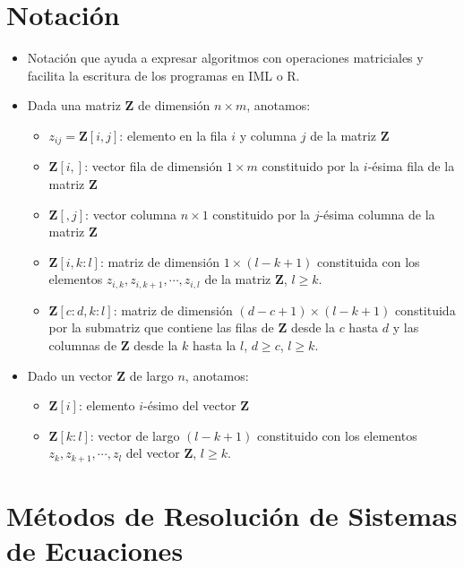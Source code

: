 \documentclass[]{book}
\providecommand{\tightlist}{%
  \setlength{\itemsep}{0pt}\setlength{\parskip}{0pt}}
\begin{document}
\hypertarget{notaciuxf3n}{%
\section{Notación}\label{notaciuxf3n}}

\begin{itemize}
\item
  Notación que ayuda a expresar algoritmos con operaciones matriciales y facilita la escritura de los programas en IML o R.
\item
  Dada una matriz \(\mathbf{Z}\) de dimensión \(n \times m\), anotamos:

  \begin{itemize}
  \tightlist
  \item
    \(z_{ij} = \mathbf{Z}[i, j]\): elemento en la fila \(i\) y columna \(j\) de la matriz \(\mathbf{Z}\)
  \item
    \(\mathbf{Z}[i,]\): vector fila de dimensión \(1\times m\) constituido por la \(i\)-ésima fila de la matriz \(\mathbf{Z}\)
  \item
    \(\mathbf{Z}[,j]\): vector columna \(n\times 1\) constituido por la \(j\)-ésima columna de la matriz \(\mathbf{Z}\)
  \item
    \(\mathbf{Z}[i,k:l]\): matriz de dimensión \(1\times (l-k+1)\) constituida con los elementos \(z_{i,k}, z_{i,k+1}, \cdots, z_{i,l}\) de la matriz \(\mathbf{Z}\), \(l \geq k\).
  \item
    \(\mathbf{Z}[c:d,k:l]\): matriz de dimensión \((d-c+1)\times (l-k+1)\) constituida por la submatriz que contiene las filas de \(\mathbf{Z}\) desde la \(c\) hasta \(d\) y las columnas de \(\mathbf{Z}\) desde la \(k\) hasta la \(l\), \(d \geq c\), \(l \geq k\).
  \end{itemize}
\item
  Dado un vector \(\mathbf{Z}\) de largo \(n\), anotamos:

  \begin{itemize}
  \tightlist
  \item
    \(\mathbf{Z}[i]\): elemento \(i\)-ésimo del vector \(\mathbf{Z}\)
  \item
    \(\mathbf{Z}[k:l]\): vector de largo \((l-k+1)\) constituido con los elementos \(z_{k}, z_{k+1}, \cdots, z_{l}\) del vector \(\mathbf{Z}\), \(l \geq k\).
  \end{itemize}
\end{itemize}

\hypertarget{muxe9todos-de-resoluciuxf3n-de-sistemas-de-ecuaciones}{%
\section{Métodos de Resolución de Sistemas de Ecuaciones}\label{muxe9todos-de-resoluciuxf3n-de-sistemas-de-ecuaciones}}
\end{document}
